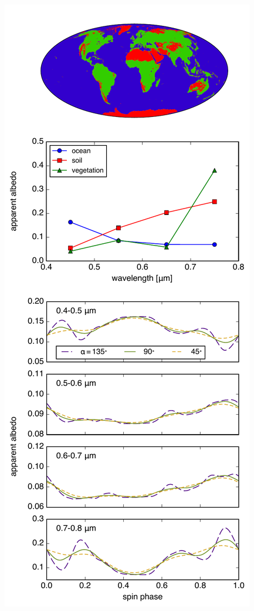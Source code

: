 \documentclass[iop,numberedappendix,apj]{emulateapj}
\begin{document}
\begin{figure}[t]
    \begin{center}
	\includegraphics[width=\hsize]{mockdata.pdf}

\end{center}
\end{figure}
\end{document}
